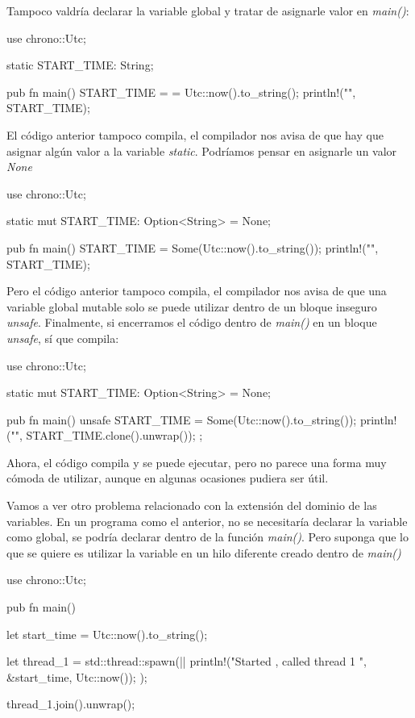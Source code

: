 \documentclass[a4paper,11pt]{extarticle}
\begin{document}
Tampoco valdría declarar la variable global y tratar de asignarle valor en \textit{main()}:

\vspace{0.7em}
\begin{Codigo2}
use chrono::Utc;

static START_TIME: String;

pub fn main() {
   START_TIME =  = Utc::now().to_string();
   println!("{}", START_TIME);
}
\end{Codigo2}

El código anterior tampoco compila, el compilador nos avisa de que hay que asignar algún valor a la variable \textit{static}. Podríamos pensar en asignarle un valor \textit{None}

\vspace{0.7em}
\begin{Codigo2}
use chrono::Utc;

static mut START_TIME: Option<String> = None;

pub fn main() {
   START_TIME = Some(Utc::now().to_string());
   println!("{}", START_TIME);
}	
\end{Codigo2}

Pero el código anterior tampoco compila, el compilador nos avisa de que una variable global mutable solo se puede utilizar dentro de un bloque inseguro \textit{unsafe{}}. Finalmente, si encerramos el código dentro de \textit{main()} en un bloque \textit{unsafe{}}, sí que compila:

\begin{Codigo2}
use chrono::Utc;

static mut START_TIME: Option<String> = None;

pub fn main() {
   unsafe{
      START_TIME =  Some(Utc::now().to_string());
      println!("{}",  START_TIME.clone().unwrap());
   };
}
\end{Codigo2}

Ahora, el código compila y se puede ejecutar, pero no parece una forma muy cómoda de utilizar, aunque en algunas ocasiones pudiera ser útil.

Vamos a ver otro problema relacionado con la extensión del dominio de las variables. En un programa como el anterior, no se necesitaría declarar la variable como global, se podría declarar dentro de la función \textit{main()}. Pero suponga que lo que se quiere es utilizar la variable en un hilo diferente creado dentro de \textit{main()}

\begin{Codigo2}
use chrono::Utc;

pub fn main() {
   let start_time = Utc::now().to_string();
   
   let thread_1 = std::thread::spawn(||{
      println!("Started {}, called thread 1 {}", &start_time, Utc::now());
   });
	
   thread_1.join().unwrap();
}
\end{Codigo2}
\end{document}

